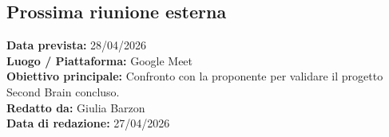 \documentclass[a4paper,12pt]{article}
\begin{document}
\subsection*{Prossima riunione esterna}
\textbf{Data prevista:} 28/04/2026 \\
\textbf{Luogo / Piattaforma:} Google Meet \\
\textbf{Obiettivo principale:} Confronto con la proponente per validare il progetto Second Brain concluso. \\



\textbf{Redatto da:} Giulia Barzon \\
\textbf{Data di redazione:} 27/04/2026
\end{document}
